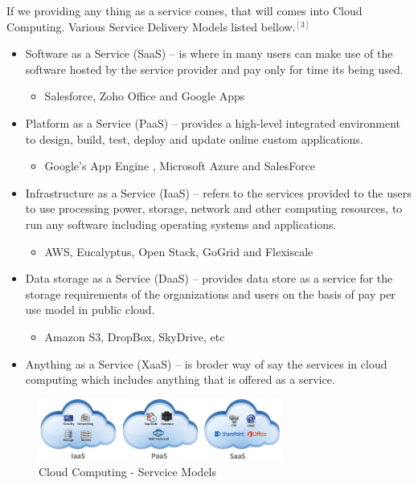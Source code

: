 \documentclass[12pt]{report}
\begin{document}
If we providing any thing as a service comes, that will comes into Cloud Computing. Various Service Delivery Models listed bellow.$ ^{[3]}$

\begin{itemize}
\item Software as a Service (SaaS) -- is where in many users can make use of the software hosted by the service provider and pay only for time its being used.
\begin{itemize}
	\item Salesforce, Zoho Office and Google Apps
\end{itemize}
\item Platform as a Service (PaaS) -- provides a high-level integrated environment to design, build, test, deploy and update online custom applications.
\begin{itemize}
	\item  Google’s App Engine , Microsoft Azure and SalesForce
\end{itemize}
\item Infrastructure as a Service (IaaS) -- refers to the services provided to the users to use processing power, storage, network and other computing resources, to run any software including operating systems and applications.
\begin{itemize}
	\item  AWS, Eucalyptus, Open Stack, GoGrid and Flexiscale
\end{itemize}

\item Data storage as a Service (DaaS) -- provides data store as a service for the storage requirements of the organizations and users on the basis of pay per use model in public cloud.
\begin{itemize}
	\item   Amazon S3, DropBox, SkyDrive, etc
\end{itemize}

\item Anything as a Service (XaaS) -- is broder way of say the services in cloud computing which includes anything that is offered as a service.

\end{itemize}

\begin{figure}[H]
 \centering
 \includegraphics[width=8cm]{./service.png}
 \caption{Cloud Computing - Servcice Models \label{fig:Cloud Computing - Servcice Models} }
\end{figure}
\end{document}
